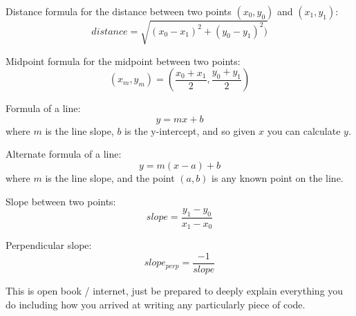 \documentclass[12pt]{article}
\newcommand{\nl}{\newline}
\begin{document}
\noindent
Distance formula for the distance between two points $(x_0, y_0)$ and $(x_1,
y_1)$:
$$distance = \sqrt{(x_0 - x_1)^2 + (y_0 - y_1)^2)}$$

\noindent\nl
Midpoint formula for the midpoint between two points:
$$(x_m, y_m) = (\frac{x_0+x_1}{2}, \frac{y_0+y_1}{2})$$

\noindent\nl
Formula of a line:
$$y = mx + b$$ 
where $m$ is the line slope, $b$ is the
y-intercept, and so given $x$ you can calculate $y$.

\noindent\nl
Alternate formula of a line:
$$y = m(x-a)+b$$
where $m$ is the line slope, and the
point $(a,b)$ is any known point on the line.

\noindent\nl
Slope between two points:
$$slope = \frac{y_1 - y_0}{x_1 - x_0}$$

\noindent\nl
Perpendicular slope:
$$slope_{perp} = \frac{-1}{slope}$$

This is open book / internet, just be prepared to deeply explain everything you
do including how you arrived at writing any particularly piece of code.
\end{document}
